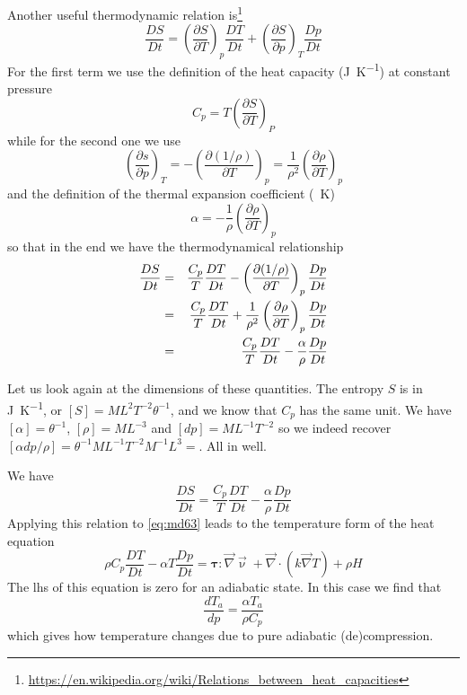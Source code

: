 Another useful thermodynamic relation is\footnote{\url{https://en.wikipedia.org/wiki/Relations_between_heat_capacities}} 
\[
\frac{DS}{Dt} = 
\left( \frac{\partial S}{\partial T} \right)_p \frac{DT}{Dt}
+
\left( \frac{\partial S}{\partial p} \right)_T \frac{Dp}{Dt}
\]
For the first term we use the definition of the 
heat capacity (\si{\joule\per\kelvin}) at constant pressure 
\[
C_p = T \left(\frac{\partial S}{\partial T} \right)_P
\]
while for the second one we use 
\[
\left( \frac{\partial s}{\partial p}  \right)_T
= -\left( \frac{\partial (1/\rho)}{\partial T}  \right)_p
= \frac{1}{\rho^2} \left(  \frac{\partial \rho}{\partial T} \right)_p
\] 
and the definition of 
the thermal expansion coefficient (\si{\per\kelvin})
\[
\alpha = -\frac{1}{\rho} \left(\frac{\partial \rho}{\partial T} \right)_p
\] 
so that in the end  
we have the thermodynamical relationship
\begin{eqnarray}
\frac{DS}{Dt} 
&=& 
\frac{C_p}{T}\frac{DT}{Dt}-\left( \frac{\partial (1/\rho)}{\partial T}  \right)_p \frac{Dp}{Dt} \nonumber\\
&=& 
\frac{C_p}{T}\frac{DT}{Dt}+\frac{1}{\rho^2} \left( \frac{\partial \rho}{\partial T}\right)_p\frac{Dp}{Dt}\nonumber\\
&=& 
\frac{C_p}{T}\frac{DT}{Dt} - \frac{\alpha}{\rho} \frac{Dp}{Dt}\nonumber
\end{eqnarray}





















\begin{remark}
Let us look again at the dimensions of these quantities.
The entropy $S$ is in \si{\joule\per\kelvin}, or $[S]=ML^2T^{-2}\theta^{-1}$, 
and we know that $C_p$ has the same unit.
We have $[\alpha]=\theta^{-1}$, $[\rho]=ML^{-3}$ and $[dp]=ML^{-1}T^{-2}$ so 
we indeed recover $[\alpha dp /\rho]= \theta^{-1} ML^{-1}T^{-2} M^{-1}L^{3}=$.
All in well.
\end{remark}

We have 
\[
\frac{DS}{Dt}
= \frac{C_p}{T} \frac{DT}{Dt} - \frac{\alpha}{\rho} \frac{Dp}{Dt} 
\]
Applying this relation to \eqref{eq:md63}
leads to the temperature form of the heat equation
\begin{equation}
\rho C_p \frac{DT}{Dt} - \alpha T \frac{Dp}{Dt} = 
{\bm \tau} : \vec\nabla\vec\upnu  
+\vec\nabla \cdot (k \vec\nabla T) + \rho H
\label{eq:md64}
\end{equation}
The lhs of this equation is zero for an adiabatic state. In this case we find that
\begin{equation}
\frac{dT_a}{dp} = \frac{\alpha T_a}{\rho C_p}
\label{eq:md65}
\end{equation}
which gives how temperature changes due to pure adiabatic (de)compression.

